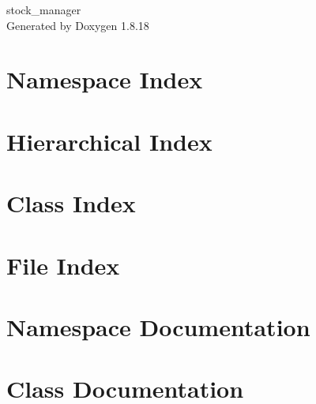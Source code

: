 \let\mypdfximage\pdfximage\def\pdfximage{\immediate\mypdfximage}\documentclass[twoside]{book}
\newcommand{\+}{\discretionary{\mbox{\scriptsize$\hookleftarrow$}}{}{}}
\newcommand{\clearemptydoublepage}{%
  \newpage{\pagestyle{empty}\cleardoublepage}%
}
\begin{document}
\hypersetup{pageanchor=false,
             bookmarksnumbered=true,
             pdfencoding=unicode
            }
\begin{titlepage}
\vspace*{7cm}
\begin{center}%
{\Large stock\+\_\+manager }\\
\vspace*{1cm}
{\large Generated by Doxygen 1.8.18}\\
\end{center}
\end{titlepage}
\clearemptydoublepage
{}
\tableofcontents
\clearemptydoublepage
{}
\hypersetup{pageanchor=true}

\chapter{Namespace Index}

\chapter{Hierarchical Index}

\chapter{Class Index}

\chapter{File Index}

\chapter{Namespace Documentation}






\chapter{Class Documentation}




















\end{document}
